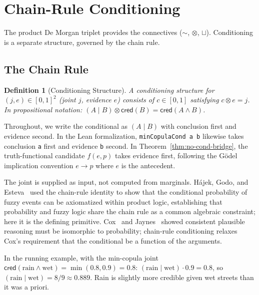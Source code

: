 \documentclass[11pt,a4paper]{article}
\newtheorem{definition}[theorem]{Definition}
\newcommand{\cred}{\mathsf{cred}}
\newcommand{\negc}{\mathord{\sim}}
\newcommand{\conjc}{\otimes}
\newcommand{\disjc}{\sqcup}
\newcommand{\condc}[2]{({#1} \mid {#2})}
\begin{document}
\section{Chain-Rule Conditioning}
\label{sec:conditioning}

The product De Morgan triplet provides the connectives
($\negc$, $\conjc$, $\disjc$).
Conditioning is a separate structure, governed by the chain rule.

\subsection{The Chain Rule}

\begin{definition}[Conditioning Structure]
\label{def:conditioning}
A \emph{conditioning structure} for $(j, e) \in [0,1]^2$
(joint $j$, evidence $e$) consists of $c \in [0,1]$ satisfying
$c \conjc e = j$.
In propositional notation:
$\condc{A}{B} \conjc \cred(B) = \cred(A \land B)$.
\end{definition}

Throughout, we write the conditional as $\condc{A}{B}$ with
conclusion first and evidence second.
In the Lean formalization, \texttt{minCopulaCond a b} likewise
takes conclusion \texttt{a} first and evidence \texttt{b} second.
In Theorem~\ref{thm:no-cond-bridge}, the truth-functional candidate
$f(e, p)$ takes evidence first, following the G\"odel implication
convention $e \to p$ where $e$ is the antecedent.

The joint is supplied as input, not computed from marginals.
H\'ajek, Godo, and Esteva~\cite{hajek1995} used the chain-rule
identity to show that the conditional probability of fuzzy events
can be axiomatized within product logic, establishing that
probability and fuzzy logic share the chain rule as a common
algebraic constraint; here it is the defining primitive.
Cox~\cite{cox1961} and Jaynes~\cite{jaynes2003} showed consistent
plausible reasoning must be isomorphic to probability;
chain-rule conditioning relaxes Cox's requirement that the
conditional be a function of the arguments.

In the running example, with the min-copula joint
$\cred(\text{rain} \land \text{wet}) = \min(0.8, 0.9) = 0.8$:
$\condc{\text{rain}}{\text{wet}} \cdot 0.9 = 0.8$,
so $\condc{\text{rain}}{\text{wet}} = 8/9 \approx 0.889$.
Rain is slightly more credible given wet streets than it was a priori.
\end{document}
